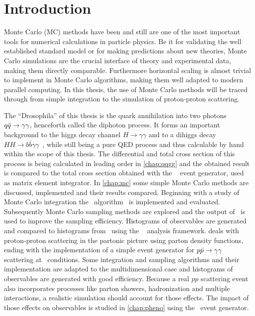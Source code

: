 \chapter{Introduction}%
\label{chap:intro}

Monte Carlo (MC) methods have been and still are one of the most important
tools for numerical calculations in particle physics. Be it for
validating the well established standard model or for making
predictions about new theories, Monte Carlo simulations are the
crucial interface of theory and experimental data, making them
directly comparable. Furthermore horizontal scaling is almost trivial
to implement in Monte Carlo algorithms, making them well adapted to
modern parallel computing. In this thesis, the use of Monte Carlo
methods will be traced through from simple integration to the
simulation of proton-proton scattering.

The ``Drosophila'' of this thesis is the quark annihilation into two
photons \(q\bar{q}\rightarrow\gamma\gamma\), henceforth called the diphoton process. It forms an
important background to the higgs decay channel
\(H\rightarrow \gamma\gamma\) and to a dihiggs decay
\(HH\rightarrow b\bar{b}\gamma\gamma\)~\cite{aaboud2018:sf}, while
still being a pure QED process and thus calculable by hand within the
scope of this thesis. The differential and total cross section of this
process is being calculated in leading order in \cref{chap:qqgg} and
the obtained result is compared to the total cross section obtained
with the \sherpa~\cite{Gleisberg:2008ta} event generator, used as
matrix element integrator. In \cref{chap:mc} some simple Monte Carlo
methods are discussed, implemented and their results
compared. Beginning with a study of Monte Carlo integration the
\vegas\ algorithm~\cite{Lepage:19781an} is implemented and
evaluated. Subsequently Monte Carlo sampling methods are explored and
the output of \vegas\ is used to improve the sampling
efficiency. Histograms of observables are generated and compared to
histograms from \sherpa\ using the \rivet~\cite{Bierlich:2019rhm}
analysis framework.  deals with proton-proton
scattering in the partonic picture using parton density functions,
ending with the implementation of a simple event generator for
\(p\bar{p}\rightarrow\gamma\gamma\) scattering at \lhc\ conditions. Some integration and
sampling algorithms and their implementation are adapted to the
multidimensional case and histograms of observables are generated with
good efficiency.  Because a real \(pp\) scattering event also
incorporates processes like parton showers, hadronization and multiple
interactions, a realistic simulation should account for those
effects. The impact of those effects on observables is studied in
\cref{chap:pheno} using the \sherpa\ event generator.

